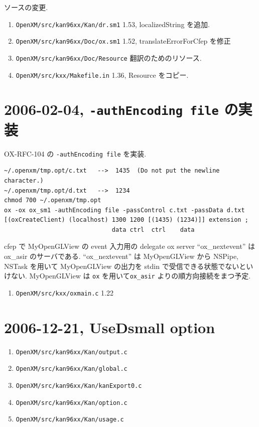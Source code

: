 \documentclass{jarticle}
\begin{document}
ソースの変更.
\begin{enumerate}
\item {\tt OpenXM/src/kan96xx/Kan/dr.sm1} 1.53,  localizedString を追加.
\item {\tt OpenXM/src/kan96xx/Doc/ox.sm1} 1.52,  translateErrorForCfep を修正
\item {\tt OpenXM/src/kan96xx/Doc/Resource}  翻訳のためのリソース.
\item {\tt OpenXM/src/kxx/Makefile.in} 1.36, Resource をコピー.
\end{enumerate}

\section{2006-02-04, {\tt -authEncoding file} の実装}

OX-RFC-104 の {\tt -authEncoding file} を実装.
\begin{verbatim}
~/.openxm/tmp.opt/c.txt   -->  1435  (Do not put the newline character.)
~/.openxm/tmp.opt/d.txt   -->  1234
chmod 700 ~/.openxm/tmp.opt
ox -ox ox_sm1 -authEncoding file -passControl c.txt -passData d.txt
[(oxCreateClient) (localhost) 1300 1200 [(1435) (1234)]] extension ;
                              data ctrl  ctrl    data
\end{verbatim}

cfep で MyOpenGLView の event 入力用の delegate ox server ``ox\_nextevent''
は ox\_asir  のサーバである.
``ox\_nextevent'' は 
MyOpenGLView から NSPipe, NSTask を用いて MyOpenGLView の出力を
stdin で受信できる状態でないといけない.
MyOpenGLView は {\tt ox} を用いて{\tt ox\_asir} よりの順方向接続をまつ予定.
\begin{enumerate}
\item {\tt OpenXM/src/kxx/oxmain.c} 1.22
\end{enumerate}

\section{2006-12-21, UseDsmall option}

\begin{enumerate}
\item {\tt OpenXM/src/kan96xx/Kan/output.c}
\item {\tt OpenXM/src/kan96xx/Kan/global.c}
\item {\tt OpenXM/src/kan96xx/Kan/kanExport0.c}
\item {\tt OpenXM/src/kan96xx/Kan/option.c}
\item {\tt OpenXM/src/kan96xx/Kan/usage.c}
\end{enumerate}
\end{document}
